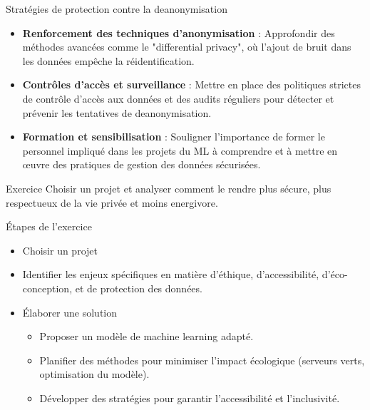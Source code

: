 \begin{frame}{Stratégies de protection contre la deanonymisation}
  \begin{itemize}
  \item \textbf{Renforcement des techniques d'anonymisation} :
    Approfondir des méthodes avancées comme le "differential privacy",
    où l'ajout de bruit dans les données empêche la réidentification.
  \item \textbf{Contrôles d'accès et surveillance} : Mettre en place
    des politiques strictes de contrôle d'accès aux données et des
    audits réguliers pour détecter et prévenir les tentatives de
    deanonymisation.
  \item \textbf{Formation et sensibilisation} : Souligner l'importance
    de former le personnel impliqué dans les projets du ML à comprendre
    et à mettre en œuvre des pratiques de gestion des données
    sécurisées.
  \end{itemize}
\end{frame}


\begin{frame}{Exercice}
  Choisir un projet et analyser comment le rendre plus sécure, plus
  respectueux de la vie privée et moins energivore.
\end{frame}

\begin{frame}{Étapes de l'exercice}
  \begin{itemize}
  \item Choisir un projet
  \item Identifier les enjeux spécifiques en matière d'éthique,
    d'accessibilité, d'éco-conception, et de protection des données.
  \item {Élaborer une solution}
    \begin{itemize}
    \item Proposer un modèle de machine learning adapté.
    \item Planifier des méthodes pour minimiser l'impact écologique
      (serveurs verts, optimisation du modèle).
    \item Développer des stratégies pour garantir l'accessibilité et
      l'inclusivité.
    \end{itemize}
  \end{itemize}
\end{frame}



